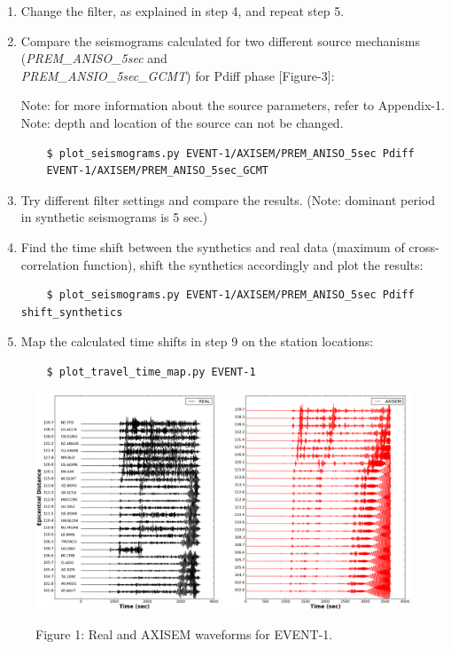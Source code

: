 \documentclass{article}
\begin{document}
\begin{enumerate}
    \item Change the filter, as explained in step 4, and repeat step 5.
    
    \item Compare the seismograms calculated for two different source
    mechanisms (\textit{PREM\_ANISO\_5sec} and \\
    \textit{PREM\_ANSIO\_5sec\_GCMT}) for Pdiff phase [Figure-3]:
    
    Note: for more information about the source parameters, refer to Appendix-1.\\
    Note: depth and location of the source can not be changed.
    \begin{verbatim}
    $ plot_seismograms.py EVENT-1/AXISEM/PREM_ANISO_5sec Pdiff 
    EVENT-1/AXISEM/PREM_ANISO_5sec_GCMT
    \end{verbatim}
    
    \item Try different filter settings and compare the results.
    (Note: dominant period in synthetic seismograms is 5 sec.)
    
    \item Find the time shift between the synthetics and real data (maximum of
    cross-correlation function), shift the synthetics accordingly and plot the results:
    
    \begin{verbatim}
    $ plot_seismograms.py EVENT-1/AXISEM/PREM_ANISO_5sec Pdiff shift_synthetics
    \end{verbatim}
    
    \item Map the calculated time shifts in step 9 on the station locations:
    
    \begin{verbatim}
    $ plot_travel_time_map.py EVENT-1
    \end{verbatim}

\end{enumerate}

\newpage
\begin{figure}[H]
    \centering
    \includegraphics[width=1.\linewidth]{AXISEMTutorial-fig007.png}
    \begin{center}
    {\small{}Figure 1: Real and AXISEM waveforms for EVENT-1.}
    \end{center}
\end{figure}
\end{document}

